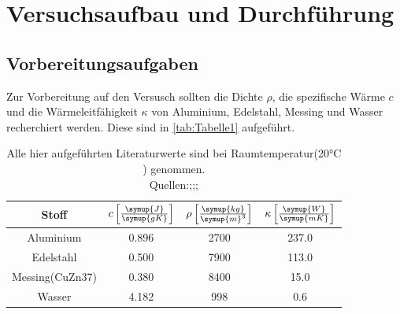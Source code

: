 \section{Versuchsaufbau und Durchführung}
\label{sec:Durchführung}
\subsection{Vorbereitungsaufgaben}
\label{subsec:Aufgaben}
Zur Vorbereitung auf den Versusch sollten die Dichte $\rho$, die spezifische Wärme $c$ und
die Wärmeleitfähigkeit $\kappa$ von Aluminium, Edelstahl, Messing und Wasser recherchiert werden.
Diese sind in \autoref{tab:Tabelle1} aufgeführt.
\begin{table}[H]
    \centering
    \caption{Alle hier aufgeführten Literaturwerte sind bei Raumtemperatur(20$\unit{\celsius}$) genommen. \\Quellen:\cite{stahl};\cite{demt};\cite{Geschke}; }
    \label{tab:Tabelle1}
    \begin{tabular}{cccc}
        \toprule
        Stoff&
        {$c \left[\frac{\symup{J}}{\symup{gK}}\right]$} &
        {$\rho \left[\frac{\symup{kg}}{\symup{m}^3}\right]$} &
        {$\kappa \left[\frac{\symup{W}}{\symup{mK}}\right]$} \\
        \midrule
        Aluminium & 0.896 & 2700 & 237.0 \\
        Edelstahl & 0.500 & 7900 & 113.0 \\
        Messing(CuZn37) & 0.380 & 8400 & 15.0 \\
        Wasser & 4.182 & 998 & 0.6 \\
        \bottomrule
    \end{tabular}
\end{table}

